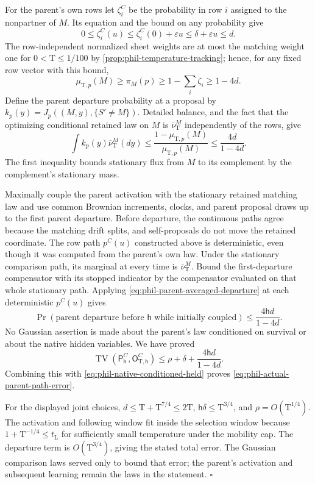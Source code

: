 For the parent's own rows let \(\zeta_i^C\) be the probability in
row \(i\) assigned to the nonpartner of \(M\). Its equation and the
bound on any probability give
\[
 0\le\zeta_i^C(u)\le\zeta_i^C(0)+\varepsilon u
                  \le\delta+\varepsilon u\le d.
\]
The row-independent normalized sheet weights are at most the matching
weight one for \(0<\mathrm T\le1/100\) by
\cref{prop:phil-temperature-tracking}; hence, for any fixed row vector
with this bound,
\[
 \mu_{\mathrm T,p}(M)\ge\pi_M(p)
               \ge1-\sum_i\zeta_i\ge1-4d.
\]
Define the parent departure probability at a proposal by
\(k_p(y)=J_p((M,y),\{S'\ne M\})\).
Detailed balance, and the fact that the optimizing conditional
retained law on \(M\) is \(\overline\nu_{\mathrm T}^M\)
independently of the rows, give
\begin{equation}
 \int k_p(y)\overline\nu_{\mathrm T}^M(dy)
 \le\frac{1-\mu_{\mathrm T,p}(M)}{\mu_{\mathrm T,p}(M)}
 \le\frac{4d}{1-4d}.
 \label{eq:phil-parent-averaged-departure}
\end{equation}
The first inequality bounds stationary flux from \(M\) to its
complement by the complement's stationary mass.

Maximally couple the parent activation with the stationary retained
matching law and use common Brownian increments, clocks, and parent
proposal draws up to the first parent departure. Before departure,
the continuous paths agree because the matching drift splits, and
self-proposals do not move the retained coordinate. The row path
\(p^C(u)\) constructed above is deterministic, even though it was
computed from the parent's own law. Under the stationary comparison
path, its marginal at every time is
\(\overline\nu_{\mathrm T}^M\). Bound the first-departure
compensator with its stopped indicator by the compensator evaluated
on that whole stationary path. Applying
\cref{eq:phil-parent-averaged-departure} at each deterministic
\(p^C(u)\) gives
\[
 \Pr(\text{parent departure before }\mathsf h
                         \text{ while initially coupled})
 \le\frac{4\mathsf h d}{1-4d}.
\]
No Gaussian assertion is made about the parent's law conditioned on
survival or about the native hidden variables. We have proved
\[
 \operatorname{TV}(\mathsf P_{\mathsf h}^C,
                         \mathsf O^C_{\mathrm T,\mathsf h})
 \le\rho+\delta+\frac{4\mathsf h d}{1-4d}.
\]
Combining this with \cref{eq:phil-native-conditioned-held} proves
\cref{eq:phil-actual-parent-path-error}.

For the displayed joint choices,
\(d\le\mathrm T+\mathrm T^{7/4}\le2\mathrm T\),
\(\mathsf h\delta\le\mathrm T^{3/4}\), and
\(\rho=O(\mathrm T^{1/4})\).
The activation and following window fit inside the selection window
because \(1+\mathrm T^{-1/4}\le t_{\mathrm L}\) for sufficiently
small temperature under the mobility cap. The departure term is
\(O(\mathrm T^{3/4})\), giving the stated total error.
The Gaussian comparison laws served only to bound that error; the
parent's activation and subsequent learning remain the laws in the
statement. \hfill\(\square\)


